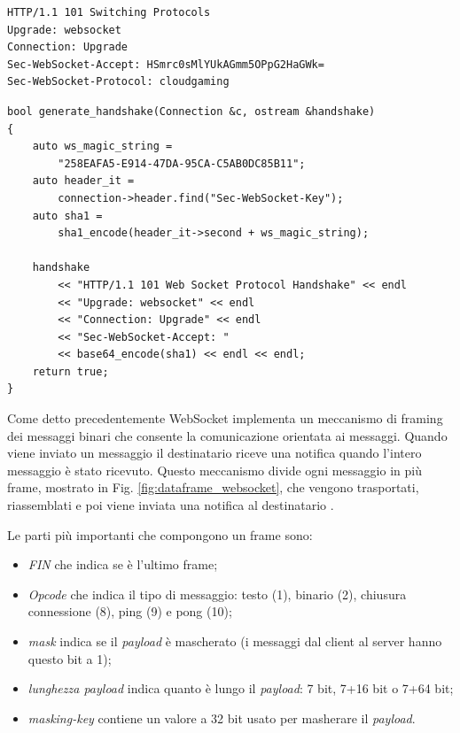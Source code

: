 \begin{lstlisting}[language=HTML, caption=Risposta handshake da parte del server, label={lst:Handshake_SRV}]
HTTP/1.1 101 Switching Protocols
Upgrade: websocket
Connection: Upgrade
Sec-WebSocket-Accept: HSmrc0sMlYUkAGmm5OPpG2HaGWk=
Sec-WebSocket-Protocol: cloudgaming
\end{lstlisting}

\begin{lstlisting}[caption=Codice per handshake implementato in SocketServerBase. File: \detokenize{lib/util/server_ws_impl.hpp}, label={lst:Handshake}]
bool generate_handshake(Connection &c, ostream &handshake)
{
	auto ws_magic_string =
		"258EAFA5-E914-47DA-95CA-C5AB0DC85B11";
	auto header_it = 
		connection->header.find("Sec-WebSocket-Key");	
	auto sha1 =
		sha1_encode(header_it->second + ws_magic_string);

	handshake
		<< "HTTP/1.1 101 Web Socket Protocol Handshake" << endl
		<< "Upgrade: websocket" << endl
		<< "Connection: Upgrade" << endl
		<< "Sec-WebSocket-Accept: "
		<< base64_encode(sha1) << endl << endl;
	return true;
}
\end{lstlisting}

Come detto precedentemente WebSocket implementa un meccanismo di framing dei messaggi binari che consente la comunicazione orientata ai messaggi. Quando viene inviato un messaggio il destinatario riceve una notifica quando l'intero messaggio è stato ricevuto. Questo meccanismo divide ogni messaggio in più frame, mostrato in Fig. \ref{fig:dataframe_websocket}, che vengono trasportati, riassemblati e poi viene inviata una notifica al destinatario \parencite{High_Performance_Browser_Networking}.

Le parti più importanti che compongono un frame sono:

\begin{itemize}
	\item \textit{FIN} che indica se è l'ultimo frame;
	\item \textit{Opcode} che indica il tipo di messaggio: testo (1), binario (2), chiusura connessione (8), ping (9) e pong (10);
	\item \textit{mask} indica se il \textit{payload} è mascherato (i messaggi dal client al server hanno questo bit a 1);
	\item \textit{lunghezza payload} indica quanto è lungo il \textit{payload}: 7 bit, 7+16 bit o 7+64 bit;
	\item \textit{masking-key} contiene un valore a 32 bit usato per masherare il \textit{payload}.
\end{itemize}

